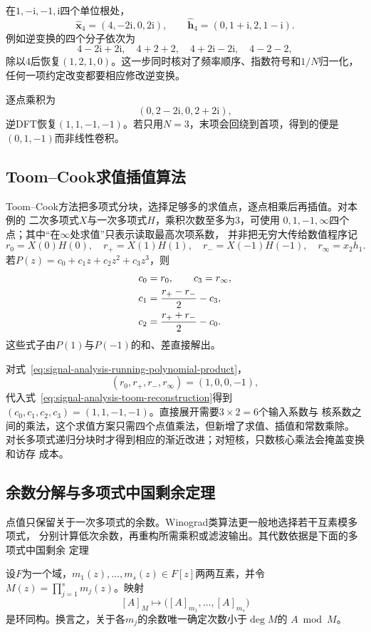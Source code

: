 在$1,-\mathrm{i},-1,\mathrm{i}$四个单位根处，
\[
  \widehat{\bm{x}}_4=(4,-2\mathrm{i},0,2\mathrm{i}),\qquad
  \widehat{\bm{h}}_4=(0,1+\mathrm{i},2,1-\mathrm{i}).
\]
例如逆变换的四个分子依次为
\[
  4-2\mathrm{i}+2\mathrm{i},\quad
  4+2+2,\quad
  4+2\mathrm{i}-2\mathrm{i},\quad
  4-2-2,
\]
除以$4$后恢复$(1,2,1,0)$。这一步同时核对了频率顺序、指数符号和$1/N$归一化，
任何一项约定改变都要相应修改逆变换。

逐点乘积为
\[
  (0,2-2\mathrm{i},0,2+2\mathrm{i}),
\]
逆DFT恢复$(1,1,-1,-1)$。若只用$N=3$，末项会回绕到首项，得到的便是
$(0,1,-1)$而非线性卷积。

\subsection{Toom--Cook求值插值算法}

Toom--Cook方法把多项式分块，选择足够多的求值点，逐点相乘后再插值。对本例的
二次多项式$X$与一次多项式$H$，乘积次数至多为$3$，可使用
$0,1,-1,\infty$四个点；其中“在$\infty$处求值”只表示读取最高次项系数，
并非把无穷大传给数值程序记
\[
  r_0=X(0)H(0),\quad
  r_+=X(1)H(1),\quad
  r_-=X(-1)H(-1),\quad
  r_\infty=x_2h_1.
\]
若$P(z)=c_0+c_1z+c_2z^2+c_3z^3$，则
\begin{align}
  c_0&=r_0,\qquad c_3=r_\infty,\notag\\
  c_1&=\frac{r_+-r_-}{2}-c_3,\notag\\
  c_2&=\frac{r_++r_-}{2}-c_0.
  \label{eq:signal-analysis-toom-reconstruction}
\end{align}
这些式子由$P(1)$与$P(-1)$的和、差直接解出。

对式~\eqref{eq:signal-analysis-running-polynomial-product}，
\[
  (r_0,r_+,r_-,r_\infty)=(1,0,0,-1),
\]
代入式~\eqref{eq:signal-analysis-toom-reconstruction}得到
$(c_0,c_1,c_2,c_3)=(1,1,-1,-1)$。直接展开需要$3\times2=6$个输入系数与
核系数之间的乘法，这个求值方案只需四个点值乘法，但新增了求值、插值和常数乘除。
对长多项式递归分块时才得到相应的渐近改进；对短核，只数核心乘法会掩盖变换和访存
成本。

\subsection{余数分解与多项式中国剩余定理}

点值只保留关于一次多项式的余数。Winograd类算法更一般地选择若干互素模多项式，
分别计算低次余数，再重构所需乘积或滤波输出。其代数依据是下面的多项式中国剩余
定理

\begin{theorem}[多项式中国剩余定理]
\label{thm:signal-analysis-polynomial-crt}
设$F$为一个域，$m_1(z),\ldots,m_s(z)\in F[z]$两两互素，并令
$M(z)=\prod_{j=1}^{s}m_j(z)$。映射
\[
  [A]_M
  \longmapsto
  \bigl([A]_{m_1},\ldots,[A]_{m_s}\bigr)
\]
是环同构。换言之，关于各$m_j$的余数唯一确定次数小于$\deg M$的
$A\bmod M$。
\end{theorem}

